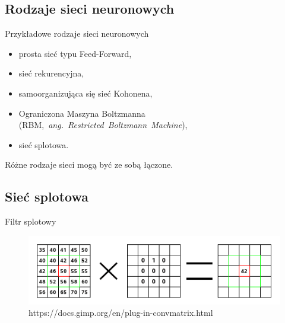 \documentclass[xcolor=dvipsnames]{beamer}
\begin{document}
\subsection{Rodzaje sieci neuronowych}
\begin{frame}{Przykładowe rodzaje sieci neuronowych}
	\begin{itemize}
		\item prosta sieć typu Feed-Forward,
		\item sieć rekurencyjna,
		\item samoorganizująca się sieć Kohonena,
		\item Ograniczona Maszyna Boltzmanna (RBM,~\textit{ang.~Restricted~Boltzmann~Machine}),
		\item sieć splotowa.
	\end{itemize}
	Różne rodzaje sieci mogą być ze sobą łączone.
\end{frame}

\subsection{Sieć splotowa}
\begin{frame}{Filtr splotowy}
	\begin{figure}
		\includegraphics[height=0.6\textheight, width=\linewidth, keepaspectratio] {img/convolutional_filter.png}
		\caption{https://docs.gimp.org/en/plug-in-convmatrix.html}
	\end{figure}
\end{frame}
\end{document}
